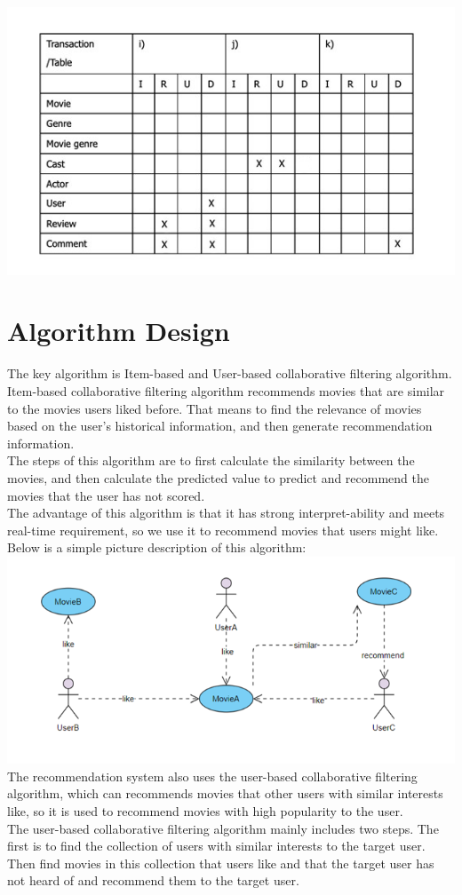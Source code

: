 \documentclass[12pt]{article}
\begin{document}
\includegraphics[width=1\linewidth]{tm3.jpg}
\newpage
\section{Algorithm Design}
The key algorithm is Item-based and User-based collaborative filtering algorithm. Item-based collaborative filtering algorithm recommends movies that are similar to the movies users liked before. That means to find the relevance of movies based on the user's historical information, and then generate recommendation information.\\
The steps of this algorithm are to first calculate the similarity between the movies, and then calculate the predicted value to predict and recommend the movies that the user has not scored.\\
The advantage of this algorithm is that it has strong interpret-ability and meets real-time requirement, so we use it to recommend movies that users might like.\\
Below is a simple picture description of this algorithm:\\
\includegraphics[width=1\linewidth]{alg.png}\\
The recommendation system also uses the user-based collaborative filtering algorithm, which can recommends movies that other users with similar interests like, so it is used to recommend movies with high popularity to the user.\\
The user-based collaborative filtering algorithm mainly includes two steps. The first is to find the collection of users with similar interests to the target user. Then find movies in this collection that users like and that the target user has not heard of and recommend them to the target user.\\
\end{document}
